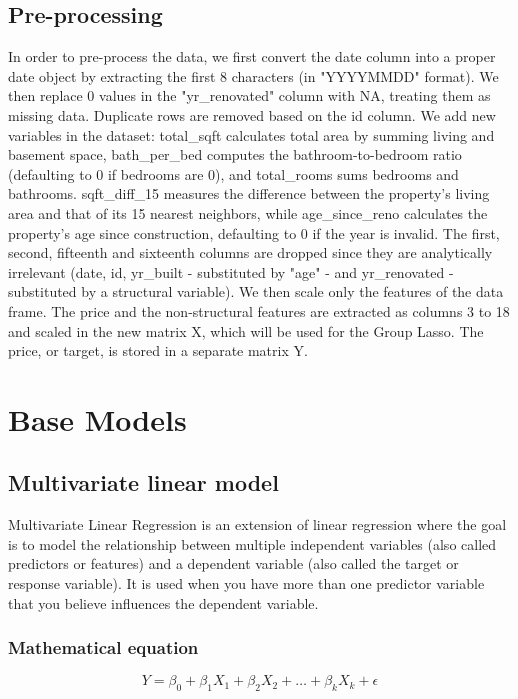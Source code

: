 \documentclass[a4paper, 8pt]{article}
\begin{document}
\begin{multicols}{2}
\subsection{Pre-processing}
In order to pre-process the data, we first convert the date column into a proper date object by extracting the first 8 characters (in "YYYYMMDD" format). We then replace 0 values in the "yr{\_}renovated" column with NA, treating them as missing data. Duplicate rows are removed based on the id column.
We add new variables in the dataset: total{\_}sqft calculates total area by summing living and basement space, bath{\_}per{\_}bed computes the bathroom-to-bedroom ratio (defaulting to 0 if bedrooms are 0), and total{\_}rooms sums bedrooms and bathrooms. sqft{\_}diff{\_}15 measures the difference between the property’s living area and that of its 15 nearest neighbors, while age{\_}since{\_}reno calculates the property’s age since construction, defaulting to 0 if the year is invalid.
The first, second, fifteenth and sixteenth columns are dropped since they are analytically irrelevant (date, id, yr{\_}built - substituted by "age" - and yr{\_}renovated - substituted by a structural variable). We then scale only the features of the data frame.
The price and the non-structural features are extracted as columns 3 to 18 and scaled in the new matrix X, which will be used for the Group Lasso. The price, or target, is stored in a separate matrix Y.


\section{Base Models}
\subsection{Multivariate linear model}
Multivariate Linear Regression is an extension of linear regression where the goal is to model the relationship between multiple independent variables (also called predictors or features) and a dependent variable (also called the target or response variable). It is used when you have more than one predictor variable that you believe influences the dependent variable. \newpage
\subsubsection*{Mathematical equation}
\begin{equation}
Y=\beta_0+\beta_1X_1+\beta_2X_2+\dots+\beta_kX_k+\epsilon
\end{equation}


\end{multicols}
\end{document}
